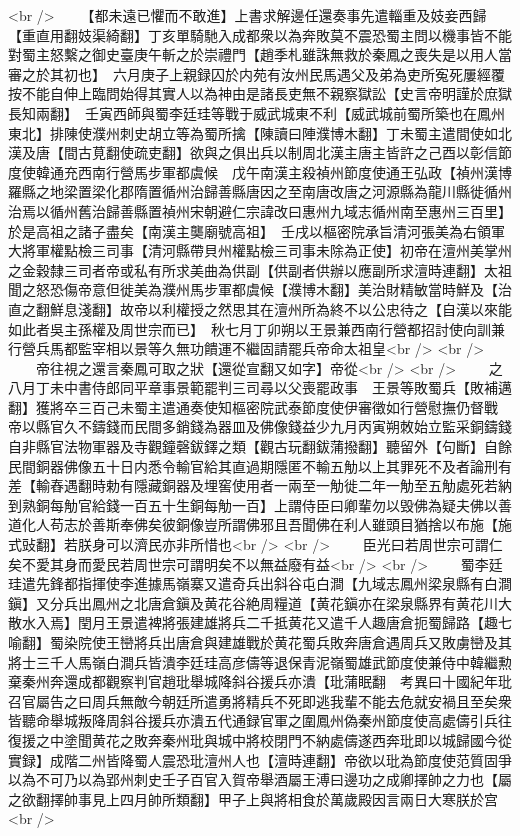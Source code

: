 <br />
　　【都未遠已懼而不敢進】上書求解邊任還奏事先遣輜重及妓妾西歸【重直用翻妓渠綺翻】丁亥單騎馳入成都衆以為奔敗莫不震恐蜀主問以機事皆不能對蜀主怒繫之御史臺庚午斬之於崇禮門【趙季札雖誅無救於秦鳳之喪失是以用人當審之於其初也】　六月庚子上親録囚於内苑有汝州民馬遇父及弟為吏所寃死屢經覆按不能自伸上臨問始得其實人以為神由是諸長吏無不親察獄訟【史言帝明謹於庶獄長知兩翻】　壬寅西師與蜀李廷珪等戰于威武城東不利【威武城前蜀所築也在鳳州東北】排陳使濮州刺史胡立等為蜀所擒【陳讀曰陣濮博木翻】丁未蜀主遣間使如北漢及唐【間古莧翻使疏吏翻】欲與之俱出兵以制周北漢主唐主皆許之己酉以彰信節度使韓通充西南行營馬步軍都虞候　戊午南漢主殺禎州節度使通王弘政【禎州漢博羅縣之地梁置梁化郡隋置循州治歸善縣唐因之至南唐改唐之河源縣為龍川縣徙循州治焉以循州舊治歸善縣置禎州宋朝避仁宗諱改曰惠州九域志循州南至惠州三百里】於是高祖之諸子盡矣【南漢主龑廟號高祖】　壬戌以樞密院承旨清河張美為右領軍大將軍權點檢三司事【清河縣帶貝州權點檢三司事未除為正使】初帝在澶州美掌州之金穀隸三司者帝或私有所求美曲為供副【供副者供辦以應副所求澶時連翻】太祖聞之怒恐傷帝意但徙美為濮州馬步軍都虞候【濮博木翻】美治財精敏當時鮮及【治直之翻鮮息淺翻】故帝以利權授之然思其在澶州所為終不以公忠待之【自漢以來能如此者吳主孫權及周世宗而已】　秋七月丁卯朔以王景兼西南行營都招討使向訓兼行營兵馬都監宰相以景等久無功饋運不繼固請罷兵帝命太祖皇<br />
<br />
　　帝往視之還言秦鳳可取之狀【還從宣翻又如字】帝從<br />
<br />
　　之　八月丁未中書侍郎同平章事景範罷判三司尋以父喪罷政事　王景等敗蜀兵【敗補邁翻】獲將卒三百己未蜀主遣通奏使知樞密院武泰節度使伊審徵如行營慰撫仍督戰　帝以縣官久不鑄錢而民間多銷錢為器皿及佛像錢益少九月丙寅朔敇始立監采銅鑄錢自非縣官法物軍器及寺觀鐘磬鈸鐸之類【觀古玩翻鈸蒲撥翻】聽留外【句斷】自餘民間銅器佛像五十日内悉令輸官給其直過期隱匿不輸五觔以上其罪死不及者論刑有差【輸舂遇翻時勅有隱藏銅器及埋窖使用者一兩至一觔徙二年一觔至五觔處死若納到熟銅每觔官給錢一百五十生銅每觔一百】上謂侍臣曰卿輩勿以毁佛為疑夫佛以善道化人苟志於善斯奉佛矣彼銅像豈所謂佛邪且吾聞佛在利人雖頭目猶捨以布施【施式䜴翻】若朕身可以濟民亦非所惜也<br />
<br />
　　臣光曰若周世宗可謂仁矣不愛其身而愛民若周世宗可謂明矣不以無益廢有益<br />
<br />
　　蜀李廷珪遣先鋒都指揮使李進據馬嶺寨又遣奇兵出斜谷屯白澗【九域志鳳州梁泉縣有白澗鎭】又分兵出鳳州之北唐倉鎭及黄花谷絶周糧道【黄花鎭亦在梁泉縣界有黄花川大散水入焉】閏月王景遣裨將張建雄將兵二千抵黄花又遣千人趣唐倉扼蜀歸路【趣七喻翻】蜀染院使王巒將兵出唐倉與建雄戰於黄花蜀兵敗奔唐倉遇周兵又敗虜巒及其將士三千人馬嶺白澗兵皆潰李廷珪高彦儔等退保青泥嶺蜀雄武節度使兼侍中韓繼勲棄秦州奔還成都觀察判官趙玭舉城降斜谷援兵亦潰【玭蒲眠翻　考異曰十國紀年玭召官屬告之曰周兵無敵今朝廷所遣勇將精兵不死即逃我輩不能去危就安禍且至矣衆皆聽命舉城叛降周斜谷援兵亦潰五代通録官軍之圍鳳州偽秦州節度使高處儔引兵往復援之中塗聞黄花之敗奔秦州玭與城中將校閉門不納處儔遂西奔玭即以城歸國今從實録】成階二州皆降蜀人震恐玭澶州人也【澶時連翻】帝欲以玭為節度使范質固爭以為不可乃以為郢州刺史壬子百官入賀帝舉酒屬王溥曰邊功之成卿擇帥之力也【屬之欲翻擇帥事見上四月帥所類翻】甲子上與將相食於萬歲殿因言兩日大寒朕於宫<br />

